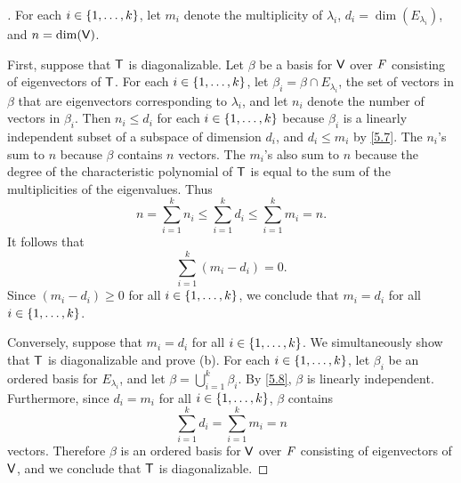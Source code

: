 \begin{proof}[]
	For each \(i \in \left\lbrace1, \dots, k\right\rbrace\), let \(m_i\) denote the multiplicity of \(\lambda_i\), \(d_i = \dim(E_{\lambda_i})\), and \(n = \dim(\mathsf{V})\).

	First, suppose that \(\mathsf{T}\) is diagonalizable.
	Let \(\beta\) be a basis for \(\mathsf{V}\) over \(\mathit{F}\) consisting of eigenvectors of \(\mathsf{T}\).
	For each \(i \in \left\lbrace1, \dots, k\right\rbrace\), let \(\beta_i = \beta \cap E_{\lambda_i}\), the set of vectors in \(\beta\) that are eigenvectors corresponding to \(\lambda_i\), and let \(n_i\) denote the number of vectors in \(\beta_i\).
	Then \(n_i \leq d_i\) for each \(i \in \left\lbrace1, \dots, k\right\rbrace\) because \(\beta_i\) is a linearly independent subset of a subspace of dimension \(d_i\), and \(d_i \leq m_i\) by \cref{5.7}.
	The \(n_i\)'s sum to \(n\) because \(\beta\) contains \(n\) vectors.
	The \(m_i\)'s also sum to \(n\) because the degree of the characteristic polynomial of \(\mathsf{T}\) is equal to the sum of the multiplicities of the eigenvalues.
	Thus
	\[
		n = \sum_{i = 1}^k n_i \leq \sum_{i = 1}^k d_i \leq \sum_{i = 1}^k m_i = n.
	\]
	It follows that
	\[
		\sum_{i = 1}^k (m_i - d_i) = 0.
	\]
	Since \((m_i - d_i) \geq 0\) for all \(i \in \left\lbrace1, \dots, k\right\rbrace\), we conclude that \(m_i = d_i\) for all \(i \in \left\lbrace1, \dots, k\right\rbrace\).

	Conversely, suppose that \(m_i = d_i\) for all \(i \in \left\lbrace1, \dots, k\right\rbrace\).
	We simultaneously show that \(\mathsf{T}\) is diagonalizable and prove (b).
	For each \(i \in \left\lbrace1, \dots, k\right\rbrace\), let \(\beta_i\) be an ordered basis for \(E_{\lambda_i}\), and let \(\beta = \bigcup_{i = 1}^k \beta_i\).
	By \cref{5.8}, \(\beta\) is linearly independent.
	Furthermore, since \(d_i = m_i\) for all \(i \in \left\lbrace1, \dots, k\right\rbrace\), \(\beta\) contains
	\[
		\sum_{i = 1}^k d_i = \sum_{i = 1}^k m_i = n
	\]
	vectors.
	Therefore \(\beta\) is an ordered basis for \(\mathsf{V}\) over \(\mathit{F}\) consisting of eigenvectors of \(\mathsf{V}\), and we conclude that \(\mathsf{T}\) is diagonalizable.
\end{proof}

